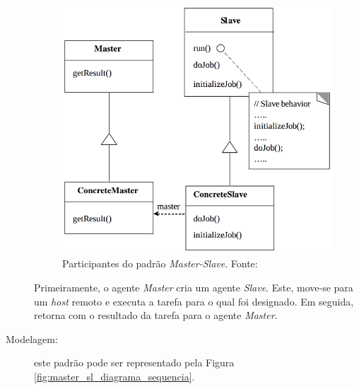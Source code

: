\begin{description}
\begin{figure}[h!]
    \centering
    \includegraphics[scale=0.35]{figuras/master_slave/master_sl_diagrama.png}
    \caption{Participantes do padrão \textit{Master-Slave}. Fonte: }
    \label{fig:master_sl_diagrama}
\end{figure}

Primeiramente, o agente \textit{Master} cria um agente \textit{Slave}. Este, move-se para um \textit{host} remoto e executa a tarefa para o qual foi designado. Em seguida, retorna com o resultado da tarefa para o agente \textit{Master}.


\item[Modelagem:] este padrão pode ser representado pela Figura \ref{fig:master_sl_diagrama_sequencia}.


\end{description}
